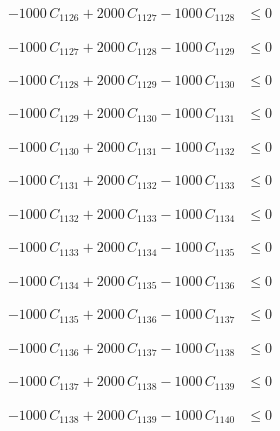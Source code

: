 \documentclass[a4paper,11pt]{article}
\begin{document}
\begin{align}
-1000\,C_{1126} + 2000\,C_{1127} - 1000\,C_{1128} &\leq 0 \nonumber
\end{align}

\begin{align}
-1000\,C_{1127} + 2000\,C_{1128} - 1000\,C_{1129} &\leq 0 \nonumber
\end{align}

\begin{align}
-1000\,C_{1128} + 2000\,C_{1129} - 1000\,C_{1130} &\leq 0 \nonumber
\end{align}

\begin{align}
-1000\,C_{1129} + 2000\,C_{1130} - 1000\,C_{1131} &\leq 0 \nonumber
\end{align}

\begin{align}
-1000\,C_{1130} + 2000\,C_{1131} - 1000\,C_{1132} &\leq 0 \nonumber
\end{align}

\begin{align}
-1000\,C_{1131} + 2000\,C_{1132} - 1000\,C_{1133} &\leq 0 \nonumber
\end{align}

\begin{align}
-1000\,C_{1132} + 2000\,C_{1133} - 1000\,C_{1134} &\leq 0 \nonumber
\end{align}

\begin{align}
-1000\,C_{1133} + 2000\,C_{1134} - 1000\,C_{1135} &\leq 0 \nonumber
\end{align}

\begin{align}
-1000\,C_{1134} + 2000\,C_{1135} - 1000\,C_{1136} &\leq 0 \nonumber
\end{align}

\begin{align}
-1000\,C_{1135} + 2000\,C_{1136} - 1000\,C_{1137} &\leq 0 \nonumber
\end{align}

\begin{align}
-1000\,C_{1136} + 2000\,C_{1137} - 1000\,C_{1138} &\leq 0 \nonumber
\end{align}

\begin{align}
-1000\,C_{1137} + 2000\,C_{1138} - 1000\,C_{1139} &\leq 0 \nonumber
\end{align}

\begin{align}
-1000\,C_{1138} + 2000\,C_{1139} - 1000\,C_{1140} &\leq 0 \nonumber
\end{align}
\end{document}
